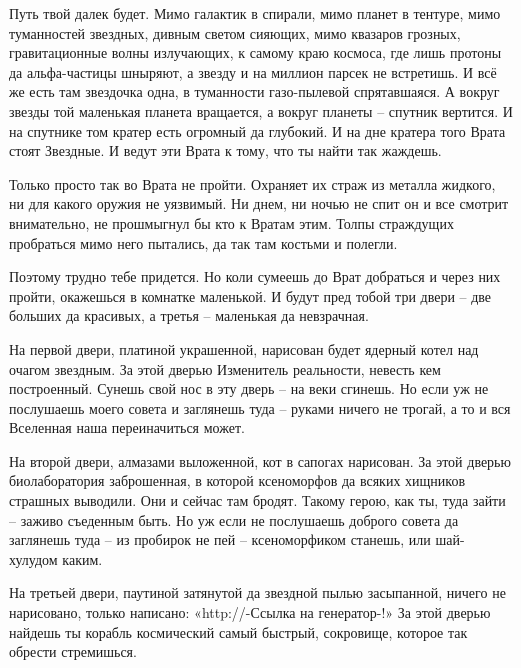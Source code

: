 \documentclass[ebook,oneside,final,openright]{memoir}
\begin{document}
\par
Путь твой далек будет. Мимо галактик в спирали, мимо планет в тентуре, мимо туманностей звездных, дивным светом сияющих, мимо квазаров грозных, гравитационные волны излучающих, к самому краю космоса, где лишь протоны да альфа-частицы шныряют, а звезду и на миллион парсек не встретишь. И всё же есть там звездочка одна, в туманности газо-пылевой спрятавшаяся. А вокруг звезды той маленькая планета вращается, а вокруг планеты – спутник вертится. И на спутнике том кратер есть огромный да глубокий. И на дне кратера того Врата стоят Звездные. И ведут эти Врата к тому, что ты найти так жаждешь.\par
\par
Только просто так во Врата не пройти. Охраняет их страж из металла жидкого, ни для какого оружия не уязвимый. Ни днем, ни ночью не спит он и все смотрит внимательно, не прошмыгнул бы кто к Вратам этим. Толпы страждущих пробраться мимо него пытались, да так там костьми и полегли.\par
\par
Поэтому трудно тебе придется. Но коли сумеешь до Врат добраться и через них пройти, окажешься в комнатке маленькой. И будут пред тобой три двери – две больших да красивых, а третья – маленькая да невзрачная.\par
\par
На первой двери, платиной украшенной, нарисован будет ядерный котел над очагом звездным. За этой дверью Изменитель реальности, невесть кем построенный. Сунешь свой нос в эту дверь – на веки сгинешь. Но если уж не послушаешь моего совета и заглянешь туда – руками ничего не трогай, а то и вся Вселенная наша переиначиться может.\par
\par
На второй двери, алмазами выложенной, кот в сапогах нарисован. За этой дверью биолаборатория заброшенная, в которой ксеноморфов да всяких хищников страшных выводили. Они и сейчас там бродят. Такому герою, как ты, туда зайти – заживо съеденным быть. Но уж если не послушаешь доброго совета да заглянешь туда – из пробирок не пей – ксеноморфиком станешь, или шай-хулудом каким.\par
\par
На третьей двери, паутиной затянутой да звездной пылью засыпанной, ничего не нарисовано, только написано: «http://-Ссылка на генератор-!» За этой дверью найдешь ты корабль космический самый быстрый, сокровище, которое так обрести стремишься.\par
\par
\end{document}
